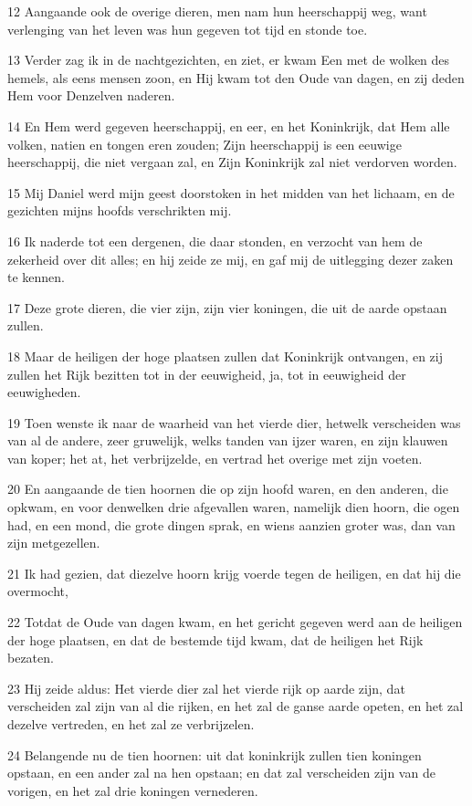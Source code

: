 \par 12 Aangaande ook de overige dieren, men nam hun heerschappij weg, want verlenging van het leven was hun gegeven tot tijd en stonde toe.
\par 13 Verder zag ik in de nachtgezichten, en ziet, er kwam Een met de wolken des hemels, als eens mensen zoon, en Hij kwam tot den Oude van dagen, en zij deden Hem voor Denzelven naderen.
\par 14 En Hem werd gegeven heerschappij, en eer, en het Koninkrijk, dat Hem alle volken, natien en tongen eren zouden; Zijn heerschappij is een eeuwige heerschappij, die niet vergaan zal, en Zijn Koninkrijk zal niet verdorven worden.
\par 15 Mij Daniel werd mijn geest doorstoken in het midden van het lichaam, en de gezichten mijns hoofds verschrikten mij.
\par 16 Ik naderde tot een dergenen, die daar stonden, en verzocht van hem de zekerheid over dit alles; en hij zeide ze mij, en gaf mij de uitlegging dezer zaken te kennen.
\par 17 Deze grote dieren, die vier zijn, zijn vier koningen, die uit de aarde opstaan zullen.
\par 18 Maar de heiligen der hoge plaatsen zullen dat Koninkrijk ontvangen, en zij zullen het Rijk bezitten tot in der eeuwigheid, ja, tot in eeuwigheid der eeuwigheden.
\par 19 Toen wenste ik naar de waarheid van het vierde dier, hetwelk verscheiden was van al de andere, zeer gruwelijk, welks tanden van ijzer waren, en zijn klauwen van koper; het at, het verbrijzelde, en vertrad het overige met zijn voeten.
\par 20 En aangaande de tien hoornen die op zijn hoofd waren, en den anderen, die opkwam, en voor denwelken drie afgevallen waren, namelijk dien hoorn, die ogen had, en een mond, die grote dingen sprak, en wiens aanzien groter was, dan van zijn metgezellen.
\par 21 Ik had gezien, dat diezelve hoorn krijg voerde tegen de heiligen, en dat hij die overmocht,
\par 22 Totdat de Oude van dagen kwam, en het gericht gegeven werd aan de heiligen der hoge plaatsen, en dat de bestemde tijd kwam, dat de heiligen het Rijk bezaten.
\par 23 Hij zeide aldus: Het vierde dier zal het vierde rijk op aarde zijn, dat verscheiden zal zijn van al die rijken, en het zal de ganse aarde opeten, en het zal dezelve vertreden, en het zal ze verbrijzelen.
\par 24 Belangende nu de tien hoornen: uit dat koninkrijk zullen tien koningen opstaan, en een ander zal na hen opstaan; en dat zal verscheiden zijn van de vorigen, en het zal drie koningen vernederen.
